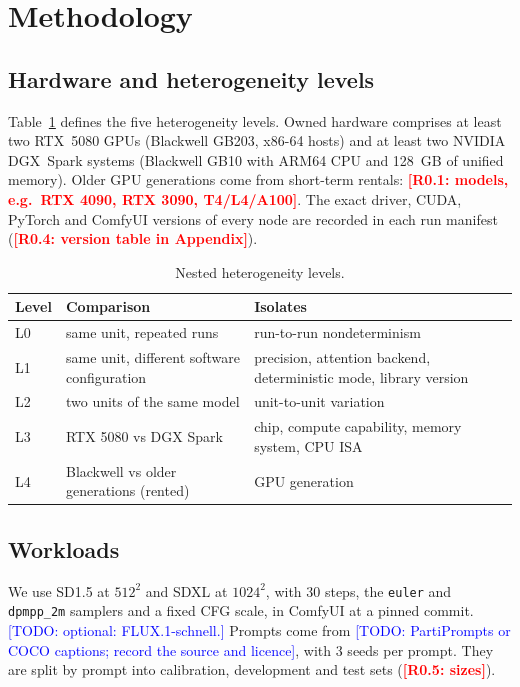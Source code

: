 \documentclass[preprint,review,12pt,authoryear]{elsarticle}
\newcommand{\res}[1]{\textcolor{red}{\textbf{[#1]}}}          %
\newcommand{\todo}[1]{\textcolor{blue}{[TODO: #1]}}            %
\theoremstyle{definition}
\begin{document}
\section{Methodology}\label{sec:method}

\subsection{Hardware and heterogeneity levels}\label{sec:method-hw}
Table~\ref{tab:levels} defines the five heterogeneity levels. Owned hardware comprises at least two RTX~5080 GPUs (Blackwell GB203, x86-64 hosts) and at least two NVIDIA DGX~Spark systems (Blackwell GB10 with ARM64 CPU and 128~GB of unified memory). Older GPU generations come from short-term rentals: \res{R0.1: models, e.g.\ RTX 4090, RTX 3090, T4/L4/A100}. The exact driver, CUDA, PyTorch and ComfyUI versions of every node are recorded in each run manifest (\res{R0.4: version table in Appendix}).

\begin{table}[t]
\centering\small
\caption{Nested heterogeneity levels.}\label{tab:levels}
\begin{tabularx}{\linewidth}{llX}
\toprule
Level & Comparison & Isolates \\
\midrule
L0 & same unit, repeated runs & run-to-run nondeterminism \\
L1 & same unit, different software configuration & precision, attention backend, deterministic mode, library version \\
L2 & two units of the same model & unit-to-unit variation \\
L3 & RTX 5080 vs DGX Spark & chip, compute capability, memory system, CPU ISA \\
L4 & Blackwell vs older generations (rented) & GPU generation \\
\bottomrule
\end{tabularx}
\end{table}

\subsection{Workloads}
We use SD1.5 \citep{rombach2022ldm} at $512^2$ and SDXL \citep{podell2023sdxl} at $1024^2$, with 30 steps, the \texttt{euler} and \texttt{dpmpp\_2m} samplers and a fixed CFG scale, in ComfyUI at a pinned commit. \todo{optional: FLUX.1-schnell.} Prompts come from \todo{PartiPrompts or COCO captions; record the source and licence}, with 3 seeds per prompt. They are split by prompt into calibration, development and test sets (\res{R0.5: sizes}).
\end{document}
